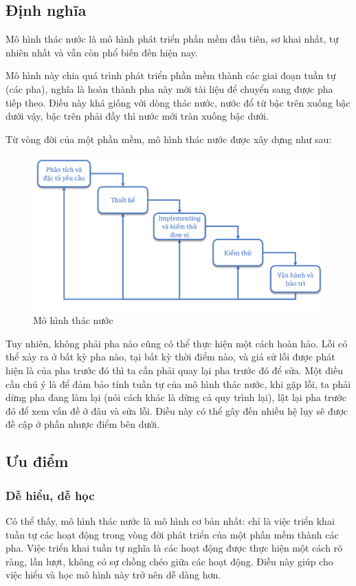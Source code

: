 \documentclass[14pt]{extarticle}
\begin{document}
\subsection{Định nghĩa}
Mô hình thác nước là mô hình phát triển phần mềm đầu tiên,
sơ khai nhất, tự nhiên nhất và vẫn còn phổ biến đến hiện nay.

Mô hình này chia quá trình phát triển phần mềm thành các giai đoạn
tuần tự (các pha), nghĩa là hoàn thành pha này mới tài liệu để
chuyển sang được pha tiếp theo.
Điều này khá giống với dòng thác nước, nước đổ từ bậc trên
xuống bậc dưới vậy, bậc trên phải đầy thì nước mới tràn xuống bậc dưới.

Từ vòng đời của một phần mềm, mô hình thác nước được xây dựng như sau:
\begin{figure}[h]
  \centering
  \includegraphics[width=\textwidth]{waterfall2.png}
  \caption{Mô hình thác nước}
  \label{fig:waterfall}
\end{figure}

Tuy nhiên, không phải pha nào cũng có thể thực hiện một cách hoàn hảo.
Lỗi có thể xảy ra ở bất kỳ pha nào, tại bất kỳ thời điểm nào, và giả
sử lỗi được phát hiện là của pha trước đó thì ta cần phải quay lại pha
trước đó để sửa. Một điều cần chú ý là để đảm bảo tính tuần tự của
mô hình thác nước, khi gặp lỗi, ta phải dừng pha đang làm lại (nói
cách khác là dừng cả quy trình lại), lật lại pha trước đó để xem
vấn đề ở đâu và sửa lỗi. Điều này có thể gây đến nhiều hệ lụy sẽ được
đề cập ở phần nhược điểm bên dưới.

\subsection{Ưu điểm}

\subsubsection*{Dễ hiểu, dễ học}
Có thể thấy, mô hình thác nước là mô hình cơ bản nhất: chỉ là việc
triển khai tuần tự các hoạt động trong vòng đời phát triển của một phần mềm thành
các pha.
Việc triển khai tuần tự nghĩa là các hoạt động được thực hiện một cách rõ ràng,
lần lượt, không có sự chồng chéo giữa các hoạt động. Điều này giúp cho việc
hiểu và học mô hình này trở nên dễ dàng hơn.
\end{document}
